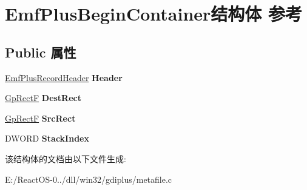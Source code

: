 \hypertarget{struct_emf_plus_begin_container}{}\section{Emf\+Plus\+Begin\+Container结构体 参考}
\label{struct_emf_plus_begin_container}
\subsection*{Public 属性}
\begin{DoxyCompactItemize}
\item 
\mbox{\label{struct_emf_plus_begin_container_abef769973bef9b83830adcddb61d2a81}} 
\hyperlink{struct_emf_plus_record_header}{Emf\+Plus\+Record\+Header} {\bfseries Header}
\item 
\mbox{\label{struct_emf_plus_begin_container_aefa83ab69ba58d72c2819162c1c506f7}} 
\hyperlink{struct_rect_f}{Gp\+RectF} {\bfseries Dest\+Rect}
\item 
\mbox{\label{struct_emf_plus_begin_container_a330bec4a41bd442e39f76e547f0d7ab2}} 
\hyperlink{struct_rect_f}{Gp\+RectF} {\bfseries Src\+Rect}
\item 
\mbox{\label{struct_emf_plus_begin_container_a371f243bdc48a24f359791227459261c}} 
D\+W\+O\+RD {\bfseries Stack\+Index}
\end{DoxyCompactItemize}


该结构体的文档由以下文件生成\+:\begin{DoxyCompactItemize}
\item 
E\+:/\+React\+O\+S-\/0../dll/win32/gdiplus/metafile.\+c\end{DoxyCompactItemize}
